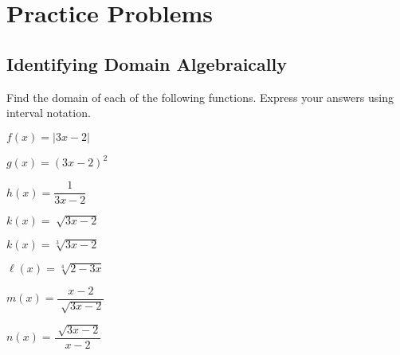 \documentclass[12pt]{book}
\theoremstyle{definition}
\begin{document}
\section{Practice Problems}
\subsection*{Identifying Domain Algebraically}

Find the domain of each of the following functions.  Express your answers using interval notation.
\begin{enumerate}
\begin{multicols}{3}
\item $f (x) = |3x-2|$
\item $g (x) = (3x-2)^2$
\item $h(x) = \dfrac{1}{3x-2}$
\item $k (x) = \sqrt[]{3x-2}$
\item $k (x) = \sqrt[3]{3x-2}$
\item $\ell (x) = \sqrt[4]{2-3x}$
\item $m(x) = \dfrac{x-2}{\sqrt[]{3x-2}}$
\item $n(x) = \dfrac{\sqrt[]{3x-2}}{x-2}$
\end{multicols}
\end{enumerate}
\end{document}
